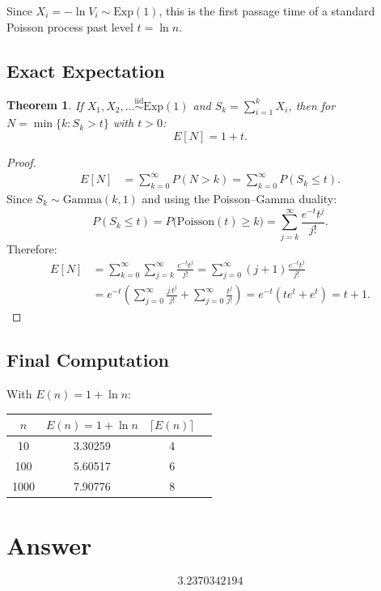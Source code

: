 \documentclass[11pt]{article}
\newtheorem{theorem}{Theorem}
\begin{document}
Since $X_i = -\ln V_i \sim \text{Exp}(1)$, this is the first passage time of a standard Poisson process past level $t = \ln n$.

\subsection{Exact Expectation}

\begin{theorem}
    If $X_1, X_2, \ldots \overset{\text{iid}}{\sim} \text{Exp}(1)$ and $S_k = \sum_{i=1}^k X_i$, then for $N = \min\{k : S_k > t\}$ with $t > 0$:
    \[
        E[N] = 1 + t.
    \]
\end{theorem}

\begin{proof}
    \begin{align*}
        E[N] &= \sum_{k=0}^{\infty} P(N > k) = \sum_{k=0}^{\infty} P(S_k \leq t).
    \end{align*}
    Since $S_k \sim \text{Gamma}(k,1)$ and using the Poisson--Gamma duality:
    \[
        P(S_k \leq t) = P\bigl(\text{Poisson}(t) \geq k\bigr) = \sum_{j=k}^{\infty} \frac{e^{-t} t^j}{j!}.
    \]
    Therefore:
    \begin{align*}
        E[N] &= \sum_{k=0}^{\infty} \sum_{j=k}^{\infty} \frac{e^{-t} t^j}{j!}
             = \sum_{j=0}^{\infty} (j+1) \frac{e^{-t} t^j}{j!} \\
             &= e^{-t} \left( \sum_{j=0}^{\infty} \frac{j \, t^j}{j!} + \sum_{j=0}^{\infty} \frac{t^j}{j!} \right)
             = e^{-t}(t e^t + e^t)
             = t + 1.
    \end{align*}
\end{proof}

\subsection{Final Computation}

With $E(n) = 1 + \ln n$:

\begin{center}
\begin{tabular}{@{}cccc@{}}
    \toprule
    $n$ & $E(n) = 1 + \ln n$ & $\lceil E(n) \rceil$ \\
    \midrule
    10   & 3.30259 & 4 \\
    100  & 5.60517 & 6 \\
    1000 & 7.90776 & 8 \\
    \bottomrule
\end{tabular}
\end{center}

\section{Answer}

\[
\boxed{3.2370342194}
\]
\end{document}
